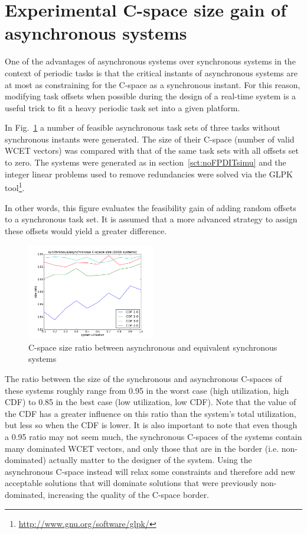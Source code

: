\documentclass[conference]{IEEEtran}
\begin{document}
\section{Experimental C-space size gain of asynchronous systems}
\label{sct:expCspaceGain}
	One of the advantages of asynchronous systems over synchronous systems in the
	context of periodic tasks is that the critical instants of asynchronous systems
	are at most as constraining for the C-space as a synchronous instant. For this
	reason, modifying task offsets when possible during
	the design of a real-time system is a useful trick to fit a heavy periodic task set
	into a given platform.

	In Fig.~\ref{fig:sizeRatio} a number of feasible asynchronous task sets of
	three tasks without synchronous instants were generated. The size of their
	C-space (number of valid WCET vectors) was compared with that of the same
	task sets with all offsets set to zero. The systems were generated as in section~\ref{sct:noFPDITsimu}
	and the integer linear problems used to remove redundancies were solved via the GLPK tool\footnote{\url{http://www.gnu.org/software/glpk/}}.

	In other words, this figure
	evaluates the feasibility gain of adding random offsets to a synchronous task
	set. It is assumed that a more advanced strategy to assign these offsets
	would yield a greater difference.

	\begin{figure}[h]
		\begin{center}
			\includegraphics[width=0.5\textwidth]{figs/sizeRatio.png}
			\caption{C-space size ratio between asynchronous and equivalent synchronous
			systems}
			\label{fig:sizeRatio}
		\end{center}
	\end{figure}

	The ratio between the size of the synchronous and asynchronous C-spaces of
	these systems roughly range from 0.95 in the worst case (high utilization, high
	CDF) to 0.85 in the best case (low utilization, low CDF). Note that the value
	of the CDF has a greater influence on this ratio than the system's total
	utilization, but less so when the CDF is lower. It is also important to note
	that even though a 0.95 ratio may not seem much, the synchronous C-spaces of
	the systems contain many dominated WCET vectors, and only those that are
	in the border (i.e. non-dominated) actually matter to the designer of the system.
	Using the asynchronous C-space instead will relax some constraints and therefore add new acceptable
	solutions that will dominate solutions that were previously non-dominated,
	increasing the quality of the C-space border.
\end{document}
